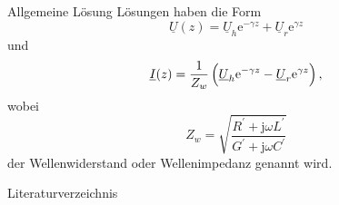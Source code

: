 \documentclass{beamer}
\begin{document}
\begin{frame}{Allgemeine Lösung}
    Lösungen haben die Form
    \begin{equation}
        \underline{U}(z) = \underline{U}_{h} \mathrm{e}^{- \gamma z}
        +
        \underline{U}_{r} \mathrm{e}^{\gamma z} \label{eq:VerlustU}
    \end{equation}
    und
    \begin{equation}
        \underline{I}(z) = \frac{1}{Z_{w}} \left( \vphantom{\sqrt{1}{Z}}
        \underline{U}_{h} \mathrm{e}^{- \gamma z} - \underline{U}_{r} \mathrm{e}^{\gamma z} \right), \label{eq:VerlustI}
    \end{equation}
    wobei
    \begin{equation}
        Z_{w} = \sqrt{\frac{R^{\prime} + \mathrm{j} \omega L^{\prime}}{G^{\prime} + \mathrm{j} \omega C^{\prime}}}
        \label{eq:Zw}
    \end{equation}
    der Wellenwiderstand oder Wellenimpedanz genannt wird.

\end{frame}




\begin{frame}{Literaturverzeichnis}
\printbibliography
\end{frame}
\end{document}
